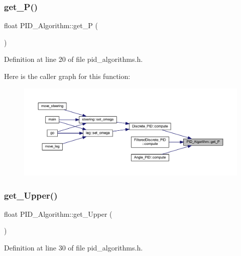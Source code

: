 \subsubsection{\texorpdfstring{get\_P()}{get\_P()}}
{\footnotesize\ttfamily float P\+I\+D\+\_\+\+Algorithm\+::get\+\_\+P (\begin{DoxyParamCaption}{ }\end{DoxyParamCaption})\hspace{0.3cm}{\ttfamily [inline]}}



Definition at line 20 of file pid\+\_\+algorithms.\+h.

Here is the caller graph for this function\+:
\nopagebreak
\begin{figure}[H]
\begin{center}
\leavevmode
\includegraphics[width=350pt]{class_p_i_d___algorithm_a0dd1059744956de2a09c72bd607ee2f4_icgraph}
\end{center}
\end{figure}
\mbox{\label{class_p_i_d___algorithm_a0adcbfe07b44479d3c46d20037bf1013}} 
\subsubsection{\texorpdfstring{get\_Upper()}{get\_Upper()}}
{\footnotesize\ttfamily float P\+I\+D\+\_\+\+Algorithm\+::get\+\_\+\+Upper (\begin{DoxyParamCaption}{ }\end{DoxyParamCaption})\hspace{0.3cm}{\ttfamily [inline]}}



Definition at line 30 of file pid\+\_\+algorithms.\+h.

